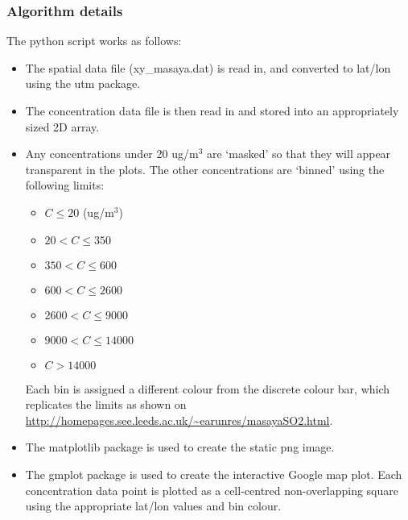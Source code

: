 \documentclass[10pt,a4paper]{article}
\begin{document}
\subsubsection{Algorithm details}
The python script works as follows:
\begin{itemize}
\item The spatial data file (xy\_masaya.dat) is read in, and converted to lat/lon using the utm package.
\item The concentration data file is then read in and stored into an appropriately sized 2D array.
\item Any concentrations under 20 ug/m$^3$ are `masked' so that they will appear transparent in the plots. The other concentrations are `binned' using the following limits:
\begin{itemize}
\item $C \leq 20$ (ug/m$^3$)
\item $20 < C \leq 350$
\item $350 < C \leq 600$
\item $600 < C \leq 2600$
\item $2600 < C \leq 9000$
\item $9000 < C \leq 14000$
\item $C > 14000$
\end{itemize}
Each bin is assigned a different colour from the discrete colour bar, which replicates the limits as shown on \url{http://homepages.see.leeds.ac.uk/~earunres/masayaSO2.html}.
\item The matplotlib package is used to create the static png image.
\item The gmplot package is used to create the interactive Google map plot. Each concentration data point is plotted as a cell-centred non-overlapping square using the appropriate lat/lon values and bin colour.
\end{itemize}
\end{document}
